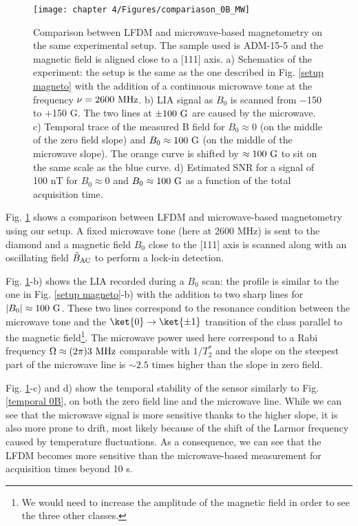 \documentclass[a4paper, 11pt]{report}
\begin{document}
\begin{figure}[h!]
\centering
\texttt{[image: chapter 4/Figures/compariason\_0B\_MW]}
\caption{Comparison between LFDM and microwave-based magnetometry on the same experimental setup. The sample used is ADM-15-5 and the magnetic field is aligned close to a [111] axis. a) Schematics of the experiment: the setup is the same as the one described in Fig. \ref{setup magneto} with the addition of a continuous microwave tone at the frequency $\nu=2600\ \rm MHz$. b) LIA signal as $B_0$ is scanned from $-$150 to +150 G. The two lines at $\pm 100\ \rm G$ are caused by the microwave. c) Temporal trace of the measured B field for $B_0 \approx 0$ (on the middle of the zero field slope) and $B_0 \approx 100\ \rm G$ (on the middle of the microwave slope). The orange curve is shifted by $\approx 100\ \rm G$ to sit on the same scale as the blue curve. d) Estimated SNR for a signal of 100 nT for $B_0 \approx 0$ and $B_0 \approx 100\ \rm G$ as a function of the total acquisition time.}
\label{comparaison 0B MW}
\end{figure}

Fig. \ref{comparaison 0B MW} shows a comparison between LFDM and microwave-based magnetometry using our setup. A fixed microwave tone (here at 2600 MHz) is sent to the diamond and a magnetic field $B_0$ close to the [111] axis is scanned along with an oscillating field $\tilde B_{\rm AC}$ to perform a lock-in detection. 

Fig. \ref{comparaison 0B MW}-b) shows the LIA recorded during a $B_0$ scan: the profile is similar to the one in Fig. \ref{setup magneto}-b) with the addition to two sharp lines for $|B_0| \approx 100\ \rm G$. These two lines correspond to the resonance condition between the microwave tone and the $\ket{0} \to \ket{\pm 1}$ transition of the class parallel to the magnetic field\footnote{We would need to increase the amplitude of the magnetic field in order to see the three other classes.}. The microwave power used here correspond to a Rabi frequency $\Omega \approx (2\pi) 3\ \rm MHz$ comparable with $1/T_2^*$ and the slope on the steepest part of the microwave line is $\sim 2.5$ times higher than the slope in zero field.

Fig. \ref{comparaison 0B MW}-c) and d) show the temporal stability of the sensor similarly to Fig. \ref{temporal 0B}, on both the zero field line and the microwave line. While we can see that the microwave signal is more sensitive thanks to the higher slope, it is also more prone to drift, most likely because of the shift of the Larmor frequency caused by temperature fluctuations. As a consequence, we can see that the LFDM becomes more sensitive than the microwave-based measurement for acquisition times beyond 10 s.
\end{document}
